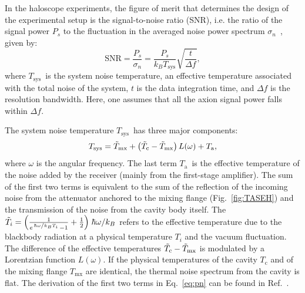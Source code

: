 \documentclass[%
 reprint,prl, %
superscriptaddress,
nobibnotes,
 amsmath,amssymb,
 aps,
]{revtex4-2}
\newcommand{\tsys}{\ensuremath{T_\text{sys}}}
\newcommand{\ta}{\ensuremath{T_\text{a}}}
\begin{document}
In the haloscope experiments, the figure of merit that determines the design 
of the experimental setup is the signal-to-noise ratio
(SNR), i.e. the ratio of the signal power $P_s$ to the fluctuation in 
the averaged noise power spectrum $\sigma_n$~\cite{Dicke}, given by:  
\begin{equation}
   \text{SNR}  =  \frac{P_s}{\sigma_n}=  \frac{P_s}{k_B\tsys}\sqrt{\frac{t}{\Delta f}},
 \label{eq:SNR}
\end{equation}  
where \tsys\ is the system noise temperature, an effective 
temperature associated with the total noise of the system, 
$t$ is the data integration time, and $\Delta f$ is the resolution bandwidth. 
Here, one assumes that all the axion signal power falls within $\Delta f$.  


The system noise temperature \tsys\ has three major components:
\begin{equation}
 \tsys = \Tilde{T}_\text{mx} + \left(\Tilde{T}_\text{c}-\Tilde{T}_\text{mx}\right)L(\omega) + \ta,
\label{eq:pn}
\end{equation}
where $\omega$ is the angular frequency.
The last term \ta\ is the effective temperature of the
noise added by the receiver (mainly from the first-stage amplifier).
The sum of the first two terms is equivalent 
to the sum of the reflection of the incoming noise from
the attenuator anchored to the mixing flange (Fig.~\ref{fig:TASEH}) 
and the transmission of the noise from the cavity body itself.
The
$\Tilde{T}_i=\left(\frac{1}{e^{\left.\hbar\omega\middle/k_BT_i\right.}-1} + \frac{1}{2}\right)\left. \hbar\omega\middle/k_B\right.$ refers to
the effective temperature due to
the blackbody radiation at a physical temperature $T_i$ and
the vacuum fluctuation.
The difference
of the effective temperatures $\Tilde{T}_\text{c}-\Tilde{T}_\text{mx}$ is
modulated by a Lorentzian function $L(\omega)$. 
If the physical temperatures of the cavity $T_\text{c}$ and of 
the mixing flange $T_\text{mx}$ 
are identical, the thermal noise spectrum from the cavity is flat. 
The derivation of the first two terms in Eq.~\eqref{eq:pn} can be found in
Ref.~\cite{TASEHAnalysis}. 
\end{document}
